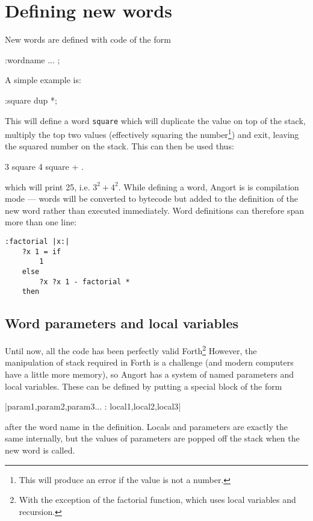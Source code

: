 \section{Defining new words}
New words are defined with code of the form
\begin{v}
:wordname ... ;
\end{v}
A simple example is:
\begin{v}
:square dup *;
\end{v}
This will define a word \texttt{square} which will duplicate
the value on top of the stack, multiply the top two values
(effectively squaring the number\footnote{This will produce
an error if the value is not a number.}) and exit, leaving the
squared number on the stack. This can then be used thus:
\begin{v}
3 square 4 square + .
\end{v}
which will print 25, i.e. $3^2+4^2$.
While defining a word, Angort is is compilation mode --- words will
be converted to bytecode but added to the definition of the new word
rather than executed immediately. Word definitions can therefore span
more than one line:
\begin{lstlisting}
:factorial |x:|
    ?x 1 = if
        1
    else
        ?x ?x 1 - factorial *
    then
\end{lstlisting}

\subsection{Word parameters and local variables}
Until now, all the code has been perfectly valid Forth\footnote{With
the exception of the factorial function, which uses local variables
and recursion.} However, the manipulation of
stack required in Forth is a challenge (and modern computers
have a little more memory), so Angort has a system of named
parameters and local variables. These can be defined by
putting a special block of the form
\begin{v}
|param1,param2,param3... : local1,local2,local3|
\end{v}
after the word name in the definition. Locals and parameters are
exactly the same internally, but the values of parameters are popped
off the stack when the new word is called. 


